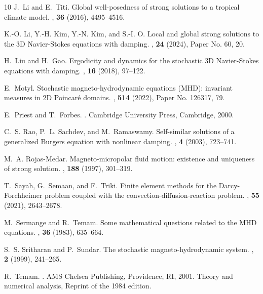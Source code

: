 \documentclass[11pt, reqno]{amsart}
\theoremstyle{definition}
\numberwithin{equation}{section}
\begin{document}
\begin{thebibliography}{10}
	J.~Li and E.~Titi.
	\newblock Global well-posedness of strong solutions to a tropical climate
	model.
	,  {\bf 36} (2016), 4495--4516.
	
	K.-O. Li, Y.-H. Kim, Y.-N. Kim, and S.-I. O.
	\newblock Local and global strong solutions to the 3{D} {N}avier-{S}tokes
	equations with damping.
	,  {\bf 24} (2024), Paper No. 60, 20.
	
	H.~Liu and H.~Gao.
	\newblock Ergodicity and dynamics for the stochastic 3{D} {N}avier-{S}tokes
	equations with damping.
	,  {\bf 16} (2018), 97--122.
	
	E.~Motyl.
	\newblock Stochastic magneto-hydrodynamic equations ({MHD}): invariant measures
	in 2{D} {P}oincar\'e{} domains.
	,  {\bf 514} (2022), Paper No. 126317, 79.
	
	E.~Priest and T.~Forbes.
	.
	\newblock Cambridge University Press, Cambridge, 2000.
	
	C.~S. Rao, P.~L. Sachdev, and M.~Ramaswamy.
	\newblock Self-similar solutions of a generalized {B}urgers equation with
	nonlinear damping.
	,  {\bf 4} (2003), 723--741.
	
	M.~A. Rojas-Medar.
	\newblock Magneto-micropolar fluid motion: existence and uniqueness of strong
	solution.
	,  {\bf 188} (1997), 301--319.
	
	T.~Sayah, G.~Semaan, and F.~Triki.
	\newblock Finite element methods for the {D}arcy-{F}orchheimer problem coupled
	with the convection-diffusion-reaction problem.
	,  {\bf 55} (2021), 2643--2678.
	
	M.~Sermange and R.~Temam.
	\newblock Some mathematical questions related to the {MHD} equations.
	,  {\bf 36} (1983), 635--664.
	
	S.~S. Sritharan and P.~Sundar.
	\newblock The stochastic magneto-hydrodynamic system.
	,  {\bf 2}
	(1999), 241--265.
	
	R.~Temam.
	.
	\newblock AMS Chelsea Publishing, Providence, RI, 2001.
	\newblock Theory and numerical analysis, Reprint of the 1984 edition.
	

\end{thebibliography}
\end{document}
